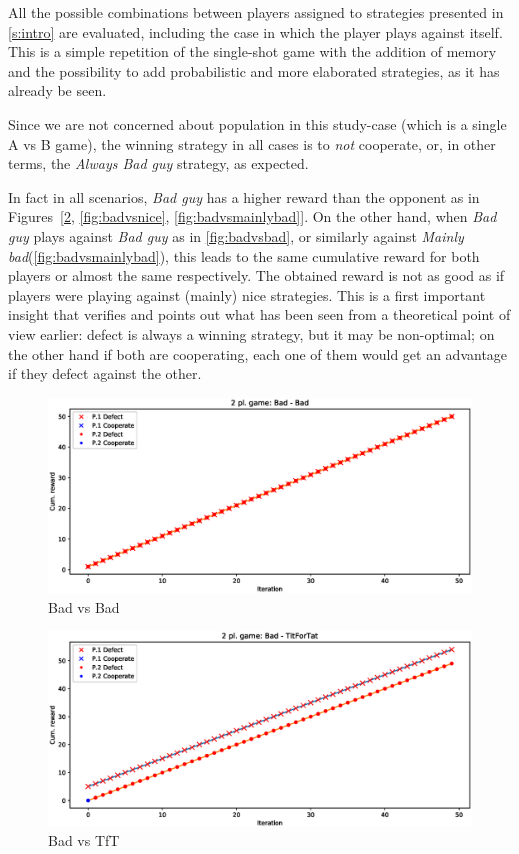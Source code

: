 \documentclass[journal,a4paper,10pt,twoside]{IEEEtran} %
\begin{document}
All the possible combinations between players assigned to strategies presented in \ref{s:intro} are evaluated, including the case in which the player plays against itself.
This is a simple repetition of the single-shot game with the addition of memory and the possibility to add probabilistic and more elaborated strategies, as it has already be seen.

Since we are not concerned about population in this study-case (which is a single A vs B game), the winning strategy in all cases is to \textit{not} cooperate, or, in other terms, the \textit{Always Bad guy} strategy, as expected.

In fact in all scenarios, \textit{Bad guy} has a higher reward than the opponent as in Figures~[\ref{fig:badvstft}, \ref{fig:badvsnice}, \ref{fig:badvsmainlybad}]. 
On the other hand, when \textit{Bad guy} plays against \textit{Bad guy} as in \autoref{fig:badvsbad}, or similarly against \textit{Mainly bad}(\autoref{fig:badvsmainlybad}), this leads to the same cumulative reward for both players or almost the same respectively. The obtained reward is not as good as if players were playing against (mainly) nice strategies. This is a first important insight that verifies and points out what has been seen from a theoretical point of view earlier: defect is always a winning strategy, but it may be non-optimal; on the other hand if both are cooperating, each one of them would get an advantage if they defect against the other.

\begin{figure}[!ht]
    \centering
    \includegraphics[width=1\columnwidth]{../img/ipd2p/ipd2p-rewards-Bad-Bad}
    \caption{Bad vs Bad}
    \label{fig:badvsbad}
\end{figure}

\begin{figure}[!ht]
    \centering
    \includegraphics[width=1\columnwidth]{../img/ipd2p/ipd2p-rewards-Bad-TitForTat}
    \caption{Bad vs TfT}
    \label{fig:badvstft}
\end{figure}
\end{document}
